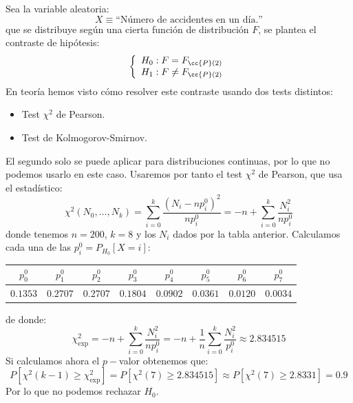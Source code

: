 \begin{ejercicio}
    \noindent
    Sea la variable aleatoria:
    \begin{equation*}
        X \equiv \text{``Número de accidentes en un día.''}
    \end{equation*}
    que se distribuye según una cierta función de distribución $F$, se plantea el contraste de hipótesis:
    \begin{equation*}
        \left\{\begin{array}{l}
                H_0 : F = F_{\cc{P}(2)}\\
                H_1 : F\neq F_{\cc{P}(2)}
        \end{array}\right.
    \end{equation*}
    En teoría hemos visto cómo resolver este contraste usando dos tests distintos:
    \begin{itemize}
        \item Test $\chi^2$ de Pearson.
        \item Test de Kolmogorov-Smirnov.
    \end{itemize}
    El segundo solo se puede aplicar para distribuciones continuas, por lo que no podemos usarlo en este caso. Usaremos por tanto el test $\chi^2$ de Pearson, que usa el estadístico:
        \begin{equation*}
            \chi^2(N_0,\ldots,N_k) = \sum_{i=0}^{k} \frac{{(N_i - np_i^0)}^{2}}{np_i^0} = -n + \sum_{i=0}^{k} \frac{N_i^2}{np_i^0} 
        \end{equation*}
        donde tenemos $n=200$, $k=8$ y los $N_i$ dados por la tabla anterior. Calculamos cada una de las $p_i^0 = P_{H_0}[X=i]$:
        \begin{table}[H]
        \centering
        \begin{tabular}{cccccccc}
            $p_0^0$ & $p_1^0$ & $p_2^0$ & $p_3^0$ & $p_4^0$ & $p_5^0$ & $p_6^0$ & $p_7^0$ \\
            \hline
            $0.1353$ & $0.2707$ & $0.2707$ & $0.1804$ & $0.0902$ & $0.0361$ & $0.0120$ & $0.0034$ \\
        \end{tabular}
        \end{table}
        \noindent
        de donde:
        \begin{equation*}
            \chi^2_{\text{exp}} = -n + \sum_{i=0}^{k} \frac{N_i^2}{np_i^0} = -n + \frac{1}{n}\sum_{i=0}^{k} \frac{N_i^2}{p_i^0} \approx 2.834515
        \end{equation*}
        Si calculamos ahora el $p-$valor obtenemos que:
        \begin{equation*}
            P[\chi^2(k-1)\geq \chi^2_{\text{exp}}] = P[\chi^2(7)\geq 2.834515] \approx P[\chi^2(7) \geq 2.8331] = 0.9
        \end{equation*}
        Por lo que no podemos rechazar $H_0$.
\end{ejercicio}

